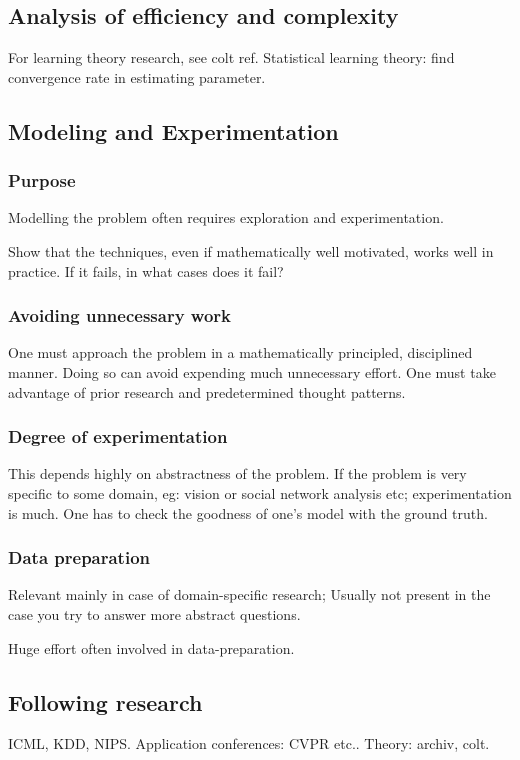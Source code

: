 \documentclass[oneside, article]{memoir}
\begin{document}
\subsection{Analysis of efficiency and complexity}
For learning theory research, see colt ref. Statistical learning theory: find convergence rate in estimating parameter.

\subsection{Modeling and Experimentation}
\subsubsection{Purpose}
Modelling the problem often requires exploration and experimentation.

Show that the techniques, even if mathematically well motivated, works well in practice. If it fails, in what cases does it fail?

\subsubsection{Avoiding unnecessary work}
One must approach the problem in a mathematically principled, disciplined manner. Doing so can avoid expending much unnecessary effort. One must take advantage of prior research and predetermined thought patterns.

\subsubsection{Degree of experimentation}
This depends highly on abstractness of the problem. If the problem is very specific to some domain, eg: vision or social network analysis etc; experimentation is much. One has to check the goodness of one's model with the ground truth.

\subsubsection{Data preparation}
Relevant mainly in case of domain-specific research; Usually not present in the case you try to answer more abstract questions.

Huge effort often involved in data-preparation.

\subsection{Following research}
ICML, KDD, NIPS. Application conferences: CVPR etc.. Theory: archiv, colt.
\end{document}
